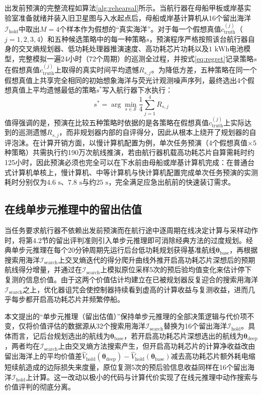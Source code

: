 出发前预演的完整流程如算法\ref{alg:rehearsal}所示。当航行器在母船甲板或岸基实验室准备就绪并装入旧卫星图与入水起点后，母船或岸基计算机从16个留出海洋$\mathcal{I}_{\text{hold}}$中取出$M=4$个样本作为假想的“真实海洋”。对于每一个假想真值$c_{\text{truth}}^{(j)}$（$j=1,2,3,4$）和五种候选策略中的每一种策略$s$，预演程序严格按照该台航行器自身的交叉熵规划器、低功耗处理器推演速度、高功耗芯片功耗以及$1\text{ kWh}$电池模型，完整模拟一遍24小时（72个周期）的巡测全过程，并按式\eqref{eq:regret}记录策略$s$在假想真值$c_{\text{truth}}^{(j)}$上取得的真实时间平均遗憾$R_{s,j}$。为降低方差，五种策略在同一个假想真值上共享完全相同的初始想象海洋与荧光计观测噪声序列，最终选出4个假想真值上平均遗憾最低的策略$s^*$写入航行器下水执行：
\begin{equation}
  s^* = \arg\min_{s\in\mathcal{S}} \frac{1}{4}\sum_{j=1}^4 R_{s,j}
  \label{eq:rehearsal_select}
\end{equation}
值得强调的是，预演在比较五种策略时依据的是各策略在假想真值$c_{\text{truth}}^{(j)}$上实际达到的巡测遗憾$R_{s,j}$，而非规划器内部的自评得分，因此从根本上绕开了规划器的自评泡沫。在计算开销方面，以慢计算机配置为例，单次任务预演（4个假想真值$\times 5$种策略）共需执行约190万次航线推演，若由航行器机载高功耗芯片自算需耗时约125小时，因此预演必须也完全可以在下水前由母船或岸基计算机完成：在普通台式计算机单核上，慢计算机、中等计算机与快计算机配置完成单次任务预演的实测耗时分别仅为$4.6\text{ s}$、$7.8\text{ s}$与约$25\text{ s}$，完全满足应急出航前的快速装订需求。

\subsection{在线单步元推理中的留出估值}

当任务要求航行器不依赖出发前预演而在航行途中逐周期在线决定计算与采样动作时，将第4.2节的留出评判准则引入单步元推理即可消除经典方法的过度规划。经典单步元推理\cite{russell1991right}在每个20分钟周期先运行后台低功耗规划获得基准航线$\bm{\theta}_{\text{base}}$，再根据搜索用海洋$\mathcal{I}_{\text{search}}$上交叉熵迭代的得分爬升曲线外推开启高功耗芯片深想后的预期航线得分增量，并通过在$\mathcal{I}_{\text{search}}$上模拟原位采样5次的预后验均值变化来估计停下复测的信息价值。由于这两个价值估计均建立在已被规划器反复迎合的搜索用海洋$\mathcal{I}_{\text{search}}$之上，优化器诅咒会使控制器持续看到虚高的计算收益与复测收益，进而几乎每步都开启高功耗芯片并频繁停船。

本文提出的“单步元推理（留出估值）”保持单步元推理的全部决策逻辑与代价项不变，仅将价值评估的数据源从32个搜索用海洋$\mathcal{I}_{\text{search}}$替换为16个留出海洋$\mathcal{I}_{\text{hold}}$。具体而言，记后台规划选出的航线为$\bm{\theta}_{\text{base}}$，若开启高功耗芯片深想选出的航线为$\bm{\theta}_{\text{deep}}$，两者均在$\mathcal{I}_{\text{search}}$上由交叉熵方法搜索产生，但开启高功耗芯片的计算净收益改由留出海洋上的平均价值差$\hat{V}_{\text{hold}}(\bm{\theta}_{\text{deep}}) - \hat{V}_{\text{hold}}(\bm{\theta}_{\text{base}})$减去高功耗芯片额外耗电缩短续航造成的边际损失来度量，原位复测5次的预后验信息收益同样在16个留出海洋$\mathcal{I}_{\text{hold}}$上计算。这一改动以极小的代码与计算代价实现了在线元推理中动作搜索与价值评判的彻底分离。
